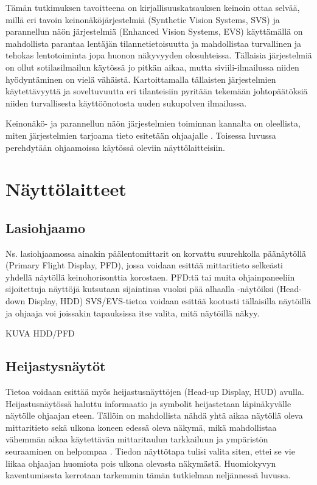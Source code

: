 \documentclass[utf8,bachelor,manualbib]{gradu3}
\begin{document}
Tämän tutkimuksen tavoitteena on kirjallisuuskatsauksen keinoin ottaa selvää, millä eri tavoin keinonäköjärjestelmiä (Synthetic Vision Systems, SVS) ja parannellun näön järjestelmiä (Enhanced Vision Systems, EVS) käyttämällä on mahdollista parantaa lentäjän tilannetietoisuutta ja mahdollistaa turvallinen ja tehokas lentotoiminta jopa huonon näkyvyyden olosuhteissa. Tällaisia järjestelmiä on ollut sotilasilmailun käytössä jo pitkän aikaa, mutta siviili-ilmailussa niiden hyödyntäminen on vielä vähäistä. Kartoittamalla tällaisten järjestelmien käytettävyyttä ja soveltuvuutta eri tilanteisiin pyritään tekemään johtopäätöksiä niiden turvallisesta käyttöönotosta uuden sukupolven ilmailussa.

Keinonäkö- ja parannellun näön järjestelmien toiminnan kannalta on oleellista, miten järjestelmien tarjoama tieto esitetään ohjaajalle \citep{kimkaber2014}. Toisessa luvussa perehdytään ohjaamoissa käytössä oleviin näyttölaitteisiin. 

\chapter{Näyttölaitteet}

\section{Lasiohjaamo}

Ns. lasiohjaamossa ainakin päälentomittarit on korvattu suurehkolla päänäytöllä (Primary Flight Display, PFD), jossa voidaan esittää mittaritieto selkeästi yhdellä näytöllä keinohorisonttia korostaen. PFD:tä tai muita ohjainpaneeliin sijoitettuja näyttöjä kutsutaan sijaintinsa vuoksi pää alhaalla -näytöiksi (Head-down Display, HDD) SVS/EVS-tietoa voidaan esittää kootusti tällaisilla näytöillä ja ohjaaja voi joissakin tapauksissa itse valita, mitä näytöillä näkyy.

KUVA HDD/PFD

\section{Heijastysnäytöt}

Tietoa voidaan esittää myös heijastusnäyttöjen (Head-up Display, HUD) avulla. Heijastusnäytössä haluttu informaatio ja symbolit heijastetaan läpinäkyvälle näytölle ohjaajan eteen. Tällöin on mahdollista nähdä yhtä aikaa näytöllä oleva mittaritieto sekä ulkona koneen edessä oleva näkymä, mikä mahdollistaa vähemmän aikaa käytettävän mittaritaulun tarkkailuun ja ympäristön seuraaminen on helpompaa \citep{crawfordneal2006}. Tiedon näyttötapa tulisi valita siten, ettei se vie liikaa ohjaajan huomiota pois ulkona olevasta näkymästä. Huomiokyvyn kaventumisesta kerrotaan tarkemmin tämän tutkielman neljännessä luvussa.
\end{document}
